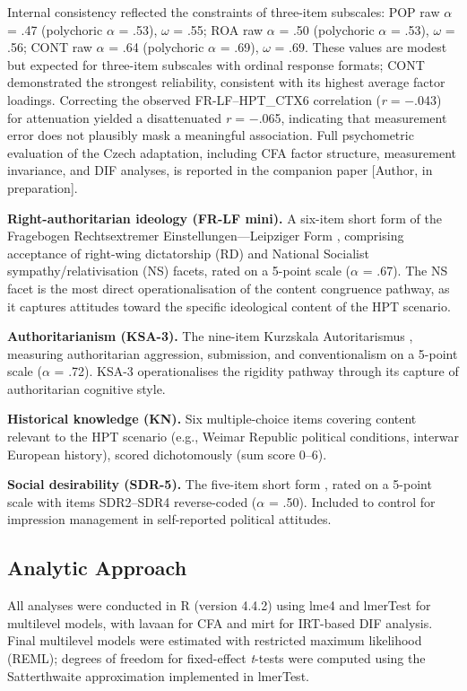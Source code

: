 \documentclass[referee,pdflatex,sn-apa]{sn-jnl}
\begin{document}
Internal consistency reflected the constraints of three-item subscales: POP raw $\alpha$ = .47 (polychoric $\alpha$ = .53), $\omega$ = .55; ROA raw $\alpha$ = .50 (polychoric $\alpha$ = .53), $\omega$ = .56; CONT raw $\alpha$ = .64 (polychoric $\alpha$ = .69), $\omega$ = .69. These values are modest but expected for three-item subscales with ordinal response formats; CONT demonstrated the strongest reliability, consistent with its highest average factor loadings. Correcting the observed FR-LF--HPT\_CTX6 correlation (\textit{r} = $-$.043) for attenuation yielded a disattenuated \textit{r} = $-$.065, indicating that measurement error does not plausibly mask a meaningful association. Full psychometric evaluation of the Czech adaptation, including CFA factor structure, measurement invariance, and DIF analyses, is reported in the companion paper [Author, in preparation].

\textbf{Right-authoritarian ideology (FR-LF mini).} A six-item short form of the Fragebogen Rechtsextremer Einstellungen---Leipziger Form \citep{Decker2013}, comprising acceptance of right-wing dictatorship (RD) and National Socialist sympathy/relativisation (NS) facets, rated on a 5-point scale ($\alpha$ = .67). The NS facet is the most direct operationalisation of the content congruence pathway, as it captures attitudes toward the specific ideological content of the HPT scenario.

\textbf{Authoritarianism (KSA-3).} The nine-item Kurzskala Autoritarismus \citep{Beierlein2014}, measuring authoritarian aggression, submission, and conventionalism on a 5-point scale ($\alpha$ = .72). KSA-3 operationalises the rigidity pathway through its capture of authoritarian cognitive style.

\textbf{Historical knowledge (KN).} Six multiple-choice items covering content relevant to the HPT scenario (e.g., Weimar Republic political conditions, interwar European history), scored dichotomously (sum score 0--6).

\textbf{Social desirability (SDR-5).} The five-item short form \citep{Hays1989}, rated on a 5-point scale with items SDR2--SDR4 reverse-coded ($\alpha$ = .50). Included to control for impression management in self-reported political attitudes.

\subsection{Analytic Approach}\label{subsec:analytic}

All analyses were conducted in R (version 4.4.2) using lme4 and lmerTest for multilevel models, with lavaan for CFA and mirt for IRT-based DIF analysis. Final multilevel models were estimated with restricted maximum likelihood (REML); degrees of freedom for fixed-effect \textit{t}-tests were computed using the Satterthwaite approximation implemented in lmerTest.
\end{document}
